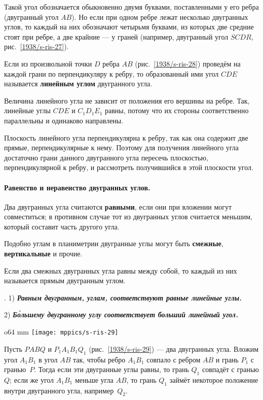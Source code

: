 Такой угол обозначается обыкновенно двумя буквами, поставленными у его ребра (двугранный угол $AB$).
Но если при одном ребре лежат несколько двугранных углов, то каждый на них обозначают четырьмя буквами, из которых две средние стоят при ребре, а две крайние — у граней (например, двугранный угол $SCDR$, рис.~\ref{1938/s-ris-27}).

Если из произвольной точки $D$ ребра $AB$ (рис.~\ref{1938/s-ris-28}) проведём на каждой грани по перпендикуляру к ребру, то образованный ими угол $CDE$ называется \textbf{линейным углом} двугранного угла.

Величина линейного угла не зависит от положения его вершины на ребре.
Так, линейные углы $CDE$ и $C_1D_1E_1$ равны, потому что их стороны соответственно параллельны и одинаково направлены.

Плоскость линейного угла перпендикулярна к ребру, так как она содержит две прямые, перпендикулярные к нему.
Поэтому для получения линейного угла достаточно грани данного двугранного угла пересечь плоскостью, перпендикулярной к ребру, и рассмотреть получившийся в этой плоскости угол.

\paragraph{Равенство и неравенство двугранных углов.}\label{1938/s39}
Два двугранных угла считаются \textbf{равными}, если они при вложении могут совместиться;
в противном случае тот из двугранных углов считается меньшим, который составит часть другого угла.

Подобно углам в планиметрии двугранные углы могут быть \textbf{смежные}, \textbf{вертикальные} и прочие.

Если два смежных двугранных угла равны между собой, то каждый из них называется прямым двугранным углом.

\medskip

.
1) \textbf{\emph{Равным двугранным, углам, соответствуют равные линейные углы.}}

2) \textbf{\emph{Б\'{о}льшему двугранному углу соответствует больший линейный угол.}}

\begin{wrapfigure}{o}{64 mm}
\centering
\texttt{[image: mppics/s-ris-29]}
\caption{}\label{1938/s-ris-29}
\end{wrapfigure}

Пусть $PABQ$ и $P_1A_1B_1Q_1$ (рис.~\ref{1938/s-ris-29}) — два двугранных угла.
Вложим угол $A_1B_1$ в угол $AB$ так, чтобы ребро $A_1B_1$ совпало с ребром $AB$ и грань $P_1$ с гранью~$P$.
Тогда если эти двугранные углы равны, то грань $Q_1$ совпадёт с гранью $Q$;
если же угол $A_1B_1$ меньше угла $AB$, то грань $Q_1$ займёт некоторое положение внутри двугранного угла, например~$Q_2$.


